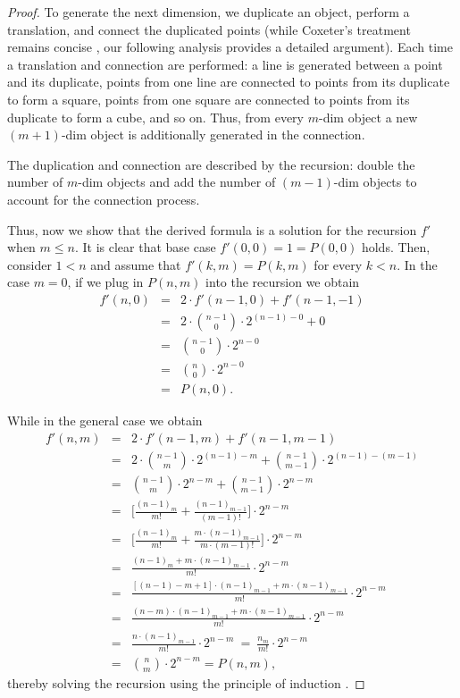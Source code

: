 \documentclass{article}
\begin{document}
	\begin{proof}
		To generate the next dimension, we duplicate an object, perform a translation, and connect the duplicated points (while Coxeter’s treatment remains concise \cite{coxeter1973regular}, our following analysis provides a detailed argument). Each time a translation and connection are performed: a line is generated between a point and its duplicate, points from one line are connected to points from its duplicate to form a square, points from one square are connected to points from its duplicate to form a cube, and so on. Thus, from every $m$-dim object a new $(m+1)$-dim object is additionally generated in the connection.
		
		The duplication and connection are described by the recursion: double the number of $m$-dim objects and add the number of $(m-1)$-dim objects to account for the connection process. 
		
		Thus, now we show that the derived formula is a solution for the recursion $f'$ when $m \leq n$. It is clear that base case $f'(0,0) = 1 = P(0,0)$ holds. Then, consider $1<n$ and assume that $f'(k,m) = P(k,m)$ for every $k < n$. In the case $m=0$, if we plug in $P(n,m)$ into the recursion we obtain
		\begin{eqnarray*}
			f'(n,0) & = & 2 \cdot f'(n-1, 0) + f'(n-1, -1)\\
			& = & 2 \cdot \binom{n-1}{0} \cdot 2^{(n-1)-0} + 0\\
			& = & \binom{n-1}{0} \cdot 2^{n-0}\\
			& = & \binom{n}{0} \cdot 2^{n-0}\\
			& = & P(n,0).
		\end{eqnarray*}
		
		While in the general case we obtain
		\begin{eqnarray*}
			f'(n,m) & = & 2 \cdot f'(n-1, m) + f'(n-1, m-1)\\
			& = & 2 \cdot \binom{n-1}{m} \cdot 2^{(n-1)-m} + \binom{n-1}{m-1} \cdot 2^{(n-1)-(m-1)}\\
			& = & \binom{n-1}{m} \cdot 2^{n-m} + \binom{n-1}{m-1} \cdot 2^{n-m}\\
			& = & \Big[\frac{(n-1)_{m}}{m!} + \frac{(n-1)_{m-1}}{(m-1)!} \Big] \cdot 2^{n-m}\\
			& = & \Bigg[\frac{(n-1)_{m}}{m!} + \frac{m \cdot (n-1)_{m-1}}{m \cdot (m-1)!} \Bigg] \cdot 2^{n-m}\\
			& = & \frac{(n-1)_{m} + m \cdot (n-1)_{m-1}}{m!} \cdot 2^{n-m}\\
			& = & \frac{[(n-1) - m + 1] \cdot (n-1)_{m-1} + m \cdot (n-1)_{m-1}}{m!} \cdot 2^{n-m}\\
			& = & \frac{(n- m) \cdot (n-1)_{m-1} + m \cdot (n-1)_{m-1}}{m!} \cdot 2^{n-m}\\
			& = & \frac{n \cdot (n-1)_{m-1}}{m!} \cdot 2^{n-m} \ = \ \frac{n_{m}}{m!} \cdot 2^{n-m}\\
			& = & \binom{n}{m}\cdot2^{n-m} = P(n,m),
		\end{eqnarray*}
		thereby solving the recursion using the principle of induction \cite{rosen2011discrete}.
	\end{proof}
	
\end{document}
